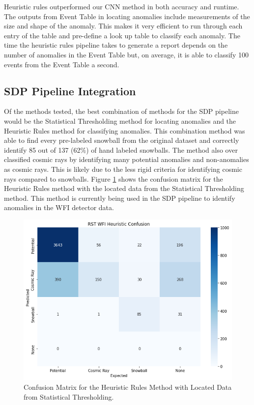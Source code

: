 Heuristic rules outperformed our CNN method in both accuracy and runtime.
The outputs from Event Table in locating anomalies include measurements of the size and shape of the anomaly. 
This makes it very efficient to run through each entry of the table and pre-define a look up table to classify each anomaly. 
The time the heuristic rules pipeline takes to generate a report depends on the number of anomalies in the Event Table but, on average, it is able to classify 100 events from the Event Table a second. 

\subsection{SDP Pipeline Integration}
Of the methods tested, the best combination of methods for the SDP pipeline would be the Statistical Thresholding method for locating anomalies and the Heuristic Rules method for classifying anomalies.
This combination method was able to find every pre-labeled snowball from the original dataset and correctly identify 85 out of 137 (62\%) of hand labeled snowballs. 
The method also over classified cosmic rays by identifying many potential anomalies and non-anomalies as cosmic rays.
This is likely due to the less rigid criteria for identifying cosmic rays compared to snowballs.
Figure \ref{chap5/fig:heuristic_confusion} shows the confusion matrix for the Heuristic Rules method with the located data from the Statistical Thresholding method.
This method is currently being used in the SDP pipeline to identify anomalies in the WFI detector data.
\begin{figure}[h]
    \centering
    \includegraphics[width=.7\textwidth]{figs/5/heuristic_confusion.png}
    \caption{Confusion Matrix for the Heuristic Rules Method with Located Data from Statistical Thresholding.}
    \label{chap5/fig:heuristic_confusion}
\end{figure}

